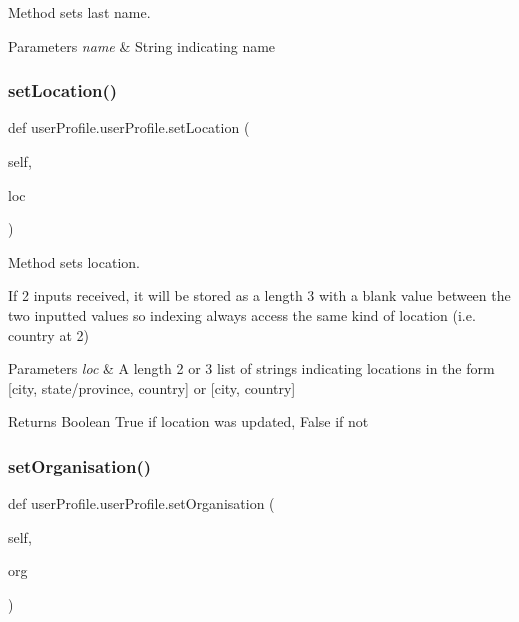 Method sets last name. 


\begin{DoxyParams}{Parameters}
{\em name} & String indicating name \\
\hline
\end{DoxyParams}
\mbox{\label{classuserProfile_1_1userProfile_ad8b26311a1d9adf8b7b29c7d7ab73358}} 
\subsubsection{\texorpdfstring{set\+Location()}{setLocation()}}
{\footnotesize\ttfamily def user\+Profile.\+user\+Profile.\+set\+Location (\begin{DoxyParamCaption}\item[{}]{self,  }\item[{}]{loc }\end{DoxyParamCaption})}



Method sets location. 

If 2 inputs received, it will be stored as a length 3 with a blank value between the two inputted values so indexing always access the same kind of location (i.\+e. country at 2) 
\begin{DoxyParams}{Parameters}
{\em loc} & A length 2 or 3 list of strings indicating locations in the form \mbox{[}city, state/province, country\mbox{]} or \mbox{[}city, country\mbox{]} \\
\hline
\end{DoxyParams}
\begin{DoxyReturn}{Returns}
Boolean True if location was updated, False if not 
\end{DoxyReturn}
\mbox{\label{classuserProfile_1_1userProfile_a240b062efefc77fb5137306709aef5ed}} 
\subsubsection{\texorpdfstring{set\+Organisation()}{setOrganisation()}}
{\footnotesize\ttfamily def user\+Profile.\+user\+Profile.\+set\+Organisation (\begin{DoxyParamCaption}\item[{}]{self,  }\item[{}]{org }\end{DoxyParamCaption})}




